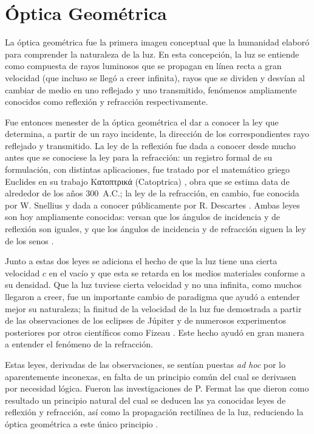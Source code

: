 \chapter{Óptica Geométrica}
\label{ch:geometrica}


La óptica geométrica fue la primera imagen conceptual que la humanidad elaboró para comprender la naturaleza de la luz. En esta concepción, la luz se entiende como compuesta de rayos luminosos que se propagan en línea recta a gran velocidad (que incluso se llegó a creer infinita), rayos que se dividen y desvían al cambiar de medio en uno reflejado y uno transmitido, fenómenos ampliamente conocidos como reflexión y refracción respectivamente.

Fue entonces menester de la óptica geométrica el dar a conocer la ley que determina, a partir de un rayo incidente, la dirección de los correspondientes rayo reflejado y transmitido. La ley de la reflexión fue dada a conocer desde mucho antes que se conociese la ley para la refracción: un registro formal de su formulación, con distintas aplicaciones, fue tratado por el matemático griego Euclides en su trabajo {\greekfont Κατοπτρικά} (Catoptrica) \cite{euclides1895catoptrica}, obra que se estima data de alrededor de los años 300~A.C.; la ley de la refracción, en cambio, fue conocida por W. Snellius y dada a conocer públicamente por R. Descartes \cite{dioptrique}. Ambas leyes son hoy ampliamente conocidas: versan que los ángulos de incidencia y de reflexión son iguales, y que los ángulos de incidencia y de refracción siguen la ley de los senos \cite{bornwolf1999}.

Junto a estas dos leyes se adiciona el hecho de que la luz tiene una cierta velocidad $c$ en el vacío y que esta se retarda en los medios materiales conforme a su densidad. Que la luz tuviese cierta velocidad y no una infinita, como muchos llegaron a creer, fue un importante cambio de paradigma que ayudó a entender mejor su naturaleza; la finitud de la velocidad de la luz fue demostrada a partir de las observaciones de los eclipses de Júpiter \cite{Romer1676} y de numerosos experimentos posteriores por otros científicos como Fizeau \cite{Fizeau1849}. Este hecho ayudó en gran manera a entender el fenómeno de la refracción.

Estas leyes, derivadas de las observaciones, se sentían puestas \textit{ad hoc} por lo aparentemente inconexas, en falta de un principio común del cual se derivasen por necesidad lógica. Fueron las investigaciones de P. Fermat las que dieron como resultado un principio natural del cual se deducen las ya conocidas leyes de reflexión y refracción, así como la propagación rectilínea de la luz, reduciendo la óptica geométrica a este único principio \cite{fermat1891oeuvres, bornwolf1999}.



